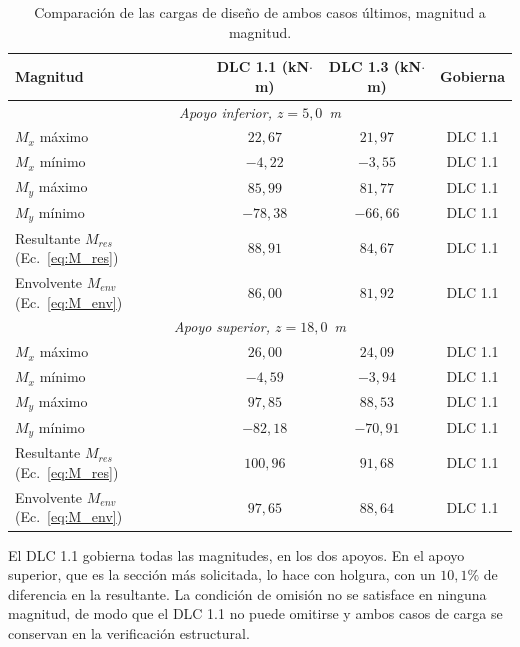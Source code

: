 \begin{table}[H]
    \centering
    \caption[Criterio de omisión del DLC 1.1.]{Comparación de las cargas de diseño de ambos casos últimos, magnitud a magnitud.}
    \label{tab:criterio_omision}
    \begin{tabular}{lccc}
        \hline
        \textbf{Magnitud} & \textbf{DLC 1.1} (kN$\cdot$m) & \textbf{DLC 1.3} (kN$\cdot$m) & \textbf{Gobierna} \\
        \hline
        \multicolumn{4}{c}{\textit{Apoyo inferior, $z = 5{,}0$~m}} \\
        \hline
        $M_x$ máximo & $22{,}67$ & $21{,}97$ & DLC 1.1 \\
        $M_x$ mínimo & $-4{,}22$ & $-3{,}55$ & DLC 1.1 \\
        $M_y$ máximo & $85{,}99$ & $81{,}77$ & DLC 1.1 \\
        $M_y$ mínimo & $-78{,}38$ & $-66{,}66$ & DLC 1.1 \\
        Resultante $M_{res}$ (Ec.~\ref{eq:M_res}) & $88{,}91$ & $84{,}67$ & DLC 1.1 \\
        Envolvente $M_{env}$ (Ec.~\ref{eq:M_env}) & $86{,}00$ & $81{,}92$ & DLC 1.1 \\
        \hline
        \multicolumn{4}{c}{\textit{Apoyo superior, $z = 18{,}0$~m}} \\
        \hline
        $M_x$ máximo & $26{,}00$ & $24{,}09$ & DLC 1.1 \\
        $M_x$ mínimo & $-4{,}59$ & $-3{,}94$ & DLC 1.1 \\
        $M_y$ máximo & $97{,}85$ & $88{,}53$ & DLC 1.1 \\
        $M_y$ mínimo & $-82{,}18$ & $-70{,}91$ & DLC 1.1 \\
        Resultante $M_{res}$ (Ec.~\ref{eq:M_res}) & $100{,}96$ & $91{,}68$ & DLC 1.1 \\
        Envolvente $M_{env}$ (Ec.~\ref{eq:M_env}) & $97{,}65$ & $88{,}64$ & DLC 1.1 \\
        \hline
    \end{tabular}
\end{table}

El DLC 1.1 gobierna todas las magnitudes, en los dos apoyos. En el apoyo superior, que es la sección más solicitada, lo hace con holgura, con un $10{,}1\%$ de diferencia en la resultante. La condición de omisión no se satisface en ninguna magnitud, de modo que el DLC 1.1 no puede omitirse y ambos casos de carga se conservan en la verificación estructural.

